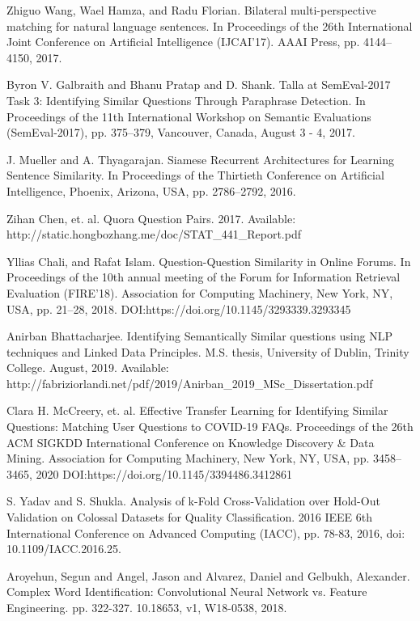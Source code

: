 \documentclass[conference]{IEEEtran}
\begin{document}
\begin{thebibliography}{00}
 Zhiguo Wang, Wael Hamza, and Radu Florian. Bilateral multi-perspective matching for natural language sentences. In Proceedings of the 26th International Joint Conference on Artificial Intelligence (IJCAI'17). AAAI Press, pp. 4144–4150, 2017.

 Byron V. Galbraith and Bhanu Pratap and D. Shank. Talla at SemEval-2017 Task 3: Identifying Similar Questions Through Paraphrase Detection. In Proceedings of the 11th International Workshop on Semantic Evaluations (SemEval-2017), pp. 375–379, Vancouver, Canada, August 3 - 4, 2017.

 J. Mueller and A. Thyagarajan. Siamese Recurrent Architectures for Learning Sentence Similarity. In Proceedings of the Thirtieth Conference on Artificial Intelligence, Phoenix, Arizona, USA, pp. 2786–2792, 2016. 

 Zihan Chen, et. al. Quora Question Pairs. 2017. Available: http://static.hongbozhang.me/doc/STAT\_441\_Report.pdf

 Yllias Chali, and Rafat Islam. Question-Question Similarity in Online Forums. In Proceedings of the 10th annual meeting of the Forum for Information Retrieval Evaluation (FIRE'18). Association for Computing Machinery, New York, NY, USA, pp. 21–28, 2018. DOI:https://doi.org/10.1145/3293339.3293345


 Anirban Bhattacharjee. Identifying Semantically Similar questions using NLP techniques and Linked Data Principles. M.S. thesis, University of Dublin, Trinity College. August, 2019. Available: http://fabriziorlandi.net/pdf/2019/Anirban\_2019\_MSc\_Dissertation.pdf

 Clara H. McCreery, et. al. Effective Transfer Learning for Identifying Similar Questions: Matching User Questions to COVID-19 FAQs. Proceedings of the 26th ACM SIGKDD International Conference on Knowledge Discovery \& Data Mining. Association for Computing Machinery, New York, NY, USA, pp. 3458–3465, 2020 DOI:https://doi.org/10.1145/3394486.3412861

 S. Yadav and S. Shukla. Analysis of k-Fold Cross-Validation over Hold-Out Validation on Colossal Datasets for Quality Classification. 2016 IEEE 6th International Conference on Advanced Computing (IACC), pp. 78-83, 2016, doi: 10.1109/IACC.2016.25. 

 Aroyehun, Segun and Angel, Jason and Alvarez, Daniel and Gelbukh, Alexander. Complex Word Identification: Convolutional Neural Network vs. Feature Engineering. pp. 322-327. 10.18653, v1, W18-0538, 2018. 


\end{thebibliography}
\end{document}
